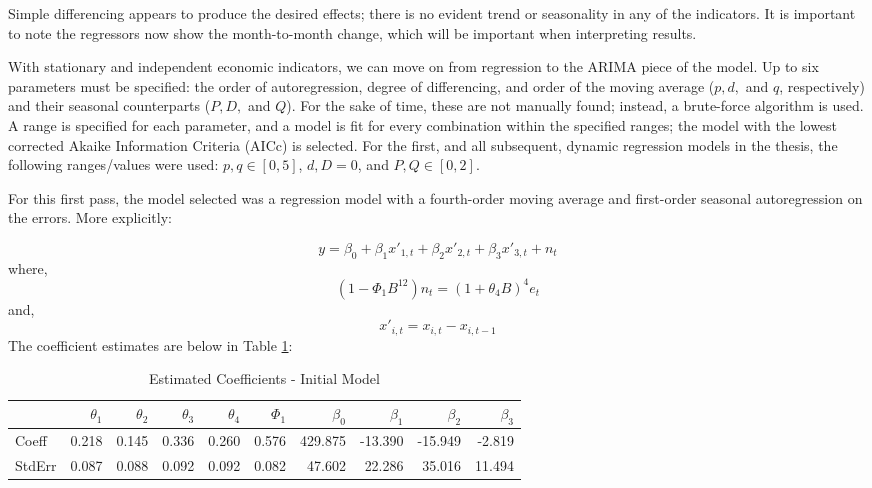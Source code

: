 \documentclass[12pt,letterpaper,toc=flat,oneside]{report}
\theoremstyle{definition}
\theoremstyle{definition}
\theoremstyle{definition}
\theoremstyle{remark}
\begin{document}
Simple differencing appears to produce the desired effects; there is no
evident trend or seasonality in any of the indicators. It is important
to note the regressors now show the month-to-month change, which will be
important when interpreting results.

With stationary and independent economic indicators, we can move on from
regression to the ARIMA piece of the model. Up to six parameters must be
specified: the order of autoregression, degree of differencing, and
order of the moving average (\(p,d,\) and \(q\), respectively) and their
seasonal counterparts (\(P,D,\) and \(Q\)). For the sake of time, these
are not manually found; instead, a brute-force algorithm is used. A
range is specified for each parameter, and a model is fit for every
combination within the specified ranges; the model with the lowest
corrected Akaike Information Criteria (AICc) is selected. For the first,
and all subsequent, dynamic regression models in the thesis, the
following ranges/values were used: \(p,q \in [0,5]\), \(d,D = 0\), and
\(P, Q \in [0,2]\).

For this first pass, the model selected was a regression model with a
fourth-order moving average and first-order seasonal autoregression on
the errors. More explicitly:

\[ y = \beta_0 + \beta_1x'_{1,t} + \beta_2x'_{2,t} + \beta_3x'_{3,t} + n_t\]
where, \[ (1-\Phi_1 B^{12})n_t = (1 + \theta_4 B)^4e_t \] and,
\[ x'_{i,t} = x_{i,t} - x_{i,t-1}\] The coefficient estimates are below
in Table \ref{tab:dynreg1-coeff}:

\begin{table}

\caption{\label{tab:dynreg1-coeff}Estimated Coefficients - Initial Model}
\centering
\begin{tabular}[t]{l|r|r|r|r|r|r|r|r|r}
\hline
  & $\theta_1$ & $\theta_2$ & $\theta_3$ & $\theta_4$ & $\Phi_1$ & $\beta_0$ & $\beta_1$ & $\beta_2$ & $\beta_3$\\
\hline
Coeff & 0.218 & 0.145 & 0.336 & 0.260 & 0.576 & 429.875 & -13.390 & -15.949 & -2.819\\
\hline
StdErr & 0.087 & 0.088 & 0.092 & 0.092 & 0.082 & 47.602 & 22.286 & 35.016 & 11.494\\
\hline
\end{tabular}
\end{table}
\end{document}
